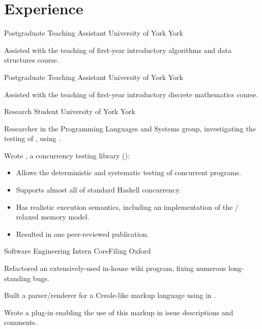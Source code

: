 \documentclass[a4paper]{barrucadu-cv}
\begin{document}
\section{Experience}

  {Postgraduate Teaching Assistant}
  {University of York}
  {York}
  {\begin{tightitemize}
    \item Assisted with the teaching of first-year introductory
      algorithms and data structures course.
    \end{tightitemize}}

  {Postgraduate Teaching Assistant}
  {University of York}
  {York}
  {\begin{tightitemize}
    \item Assisted with the teaching of first-year introductory
      discrete mathematics course.
    \end{tightitemize}}

  {Research Student}
  {University of York}
  {York}
  {\begin{tightitemize}
    \item Researcher in the Programming Languages and Systems group,
      investigating the testing of ,
      using .
    \item Wrote , a concurrency testing library
      (\textbf{}):
      \begin{itemize}
      \item Allows the deterministic and systematic testing of
        concurrent  programs.
      \item Supports almost all of standard Haskell concurrency.
      \item Has realistic execution semantics, including an
        implementation of the  / 
        relaxed memory model.
      \item Resulted in one peer-reviewed publication.
      \end{itemize}
    \end{tightitemize}}

  {Software Engineering Intern}
  {CoreFiling}
  {Oxford}
  {\begin{tightitemize}
    \item Refactored an extensively-used in-house wiki program, fixing
      numerous long-standing bugs.
    \item Built a parser/renderer for a Creole-like markup language
      using  in .
    \item Wrote a  plug-in enabling the use of this
      markup in issue descriptions and comments.
    \end{tightitemize}}
\end{document}

